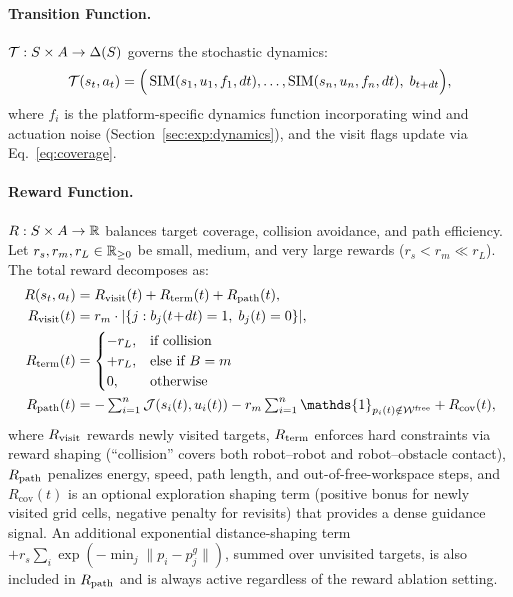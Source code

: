 \documentclass{article}
\providecommand{\free}{\mathrm{free}}
\begin{document}
\paragraph{Transition Function.}
$\mathcal{T} : S \times A \to \Delta(S)$ governs the stochastic dynamics:
\begin{equation}
    \mathcal{T}(s_t, a_t) = \Big(\operatorname{SIM}(s_1, u_1, f_1, dt), \ldots, \operatorname{SIM}(s_n, u_n, f_n, dt),\; b_{t+dt}\Big), \label{eq:transition}
\end{equation}
where $f_i$ is the platform-specific dynamics function incorporating wind and actuation noise (Section~\ref{sec:exp:dynamics}), and the visit flags update via Eq.~\eqref{eq:coverage}.

\paragraph{Reward Function.}
$R : S \times A \to \mathbb{R}$ balances target coverage, collision avoidance, and path efficiency. Let $r_s, r_m, r_L \in \mathbb{R}_{\geq 0}$ be small, medium, and very large rewards ($r_s < r_m \ll r_L$). The total reward decomposes as:
\begin{alignat}{2}
    R(s_t, a_t) &= \rvisit(t) + \rterm(t) + \rpath(t), \label{eq:reward}\\
    \rvisit(t)  &= r_m \cdot |\{j : b_j(t\!+\!dt) = 1,\; b_j(t) = 0\}|, \label{eq:r_visit} \\
    \rterm(t)   &=
    \begin{cases}
        -r_L, & \text{if collision} \\
        +r_L, & \text{else if } B = m \\
        0,    & \text{otherwise}
    \end{cases} \label{eq:r_term} \\
    \rpath(t)   &= -\textstyle\sum_{i=1}^n \mathcal{J}(s_i(t), u_i(t))
                   - r_m \sum_{i=1}^n \mathds{1}_{p_i(t) \notin \wspace^{\free}}
                   + R_{\mathrm{cov}}(t), \label{eq:r_path}
\end{alignat}
where $R_{\mathrm{visit}}$ rewards newly visited targets, $R_{\mathrm{term}}$ enforces hard constraints via reward shaping (``collision'' covers both robot--robot and robot--obstacle contact), $R_{\mathrm{path}}$ penalizes energy, speed, path length, and out-of-free-workspace steps, and $R_{\mathrm{cov}}(t)$ is an optional exploration shaping term (positive bonus for newly visited grid cells, negative penalty for revisits) that provides a dense guidance signal. An additional exponential distance-shaping term $+r_s \sum_i \exp(-\min_j \|p_i - p_j^g\|)$, summed over unvisited targets, is also included in $R_{\mathrm{path}}$ and is always active regardless of the reward ablation setting.
\end{document}
